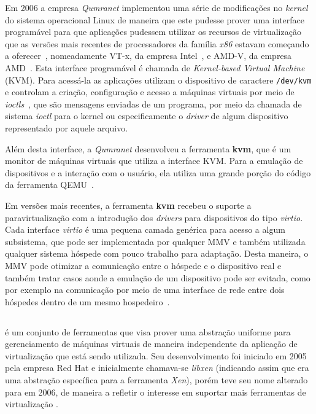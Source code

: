 Em 2006 a empresa \emph{Qumranet} implementou uma série de modificações no
\emph{kernel} do sistema operacional Linux de maneira que este pudesse prover
uma interface programável para que aplicações pudessem utilizar os recursos de
virtualização que as versões mais recentes de processadores da família
\emph{x86} estavam começando a oferecer~\cite{kerneltrap2007avi}, nomeadamente
VT-x, da empresa Intel~\cite{uhlig2005intel}, e AMD-V, da empresa
AMD~\cite{strongin2005trusted}.  Esta interface programável é chamada de
\emph{Kernel-based Virtual Machine} (KVM). Para acessá-la as aplicações
utilizam o dispositivo de caractere \texttt{/dev/kvm} e controlam a criação,
configuração e acesso a máquinas virtuais por meio de
\emph{ioctls}~\cite{kivity2007kvm}, que são mensagens enviadas de um programa,
por meio da chamada de sistema \emph{ioctl} para o kernel ou especificamente o
\emph{driver} de algum dispositivo representado por aquele arquivo.

Além desta interface, a \emph{Qumranet} desenvolveu a ferramenta \textbf{kvm},
que é um monitor de máquinas virtuais que utiliza a interface KVM. Para a
emulação de dispositivos e a interação com o usuário, ela utiliza uma grande
porção do código da ferramenta QEMU~\cite{kerneltrap2007avi}.

Em versões mais recentes, a ferramenta \textbf{kvm} recebeu o suporte a
paravirtualização com a introdução dos \emph{drivers} para dispositivos do tipo
\emph{virtio}. Cada interface \emph{virtio} é uma pequena camada genérica para
acesso a algum subsistema, que pode ser implementada por qualquer MMV e também
utilizada qualquer sistema hóspede com pouco trabalho para adaptação. Desta
maneira, o MMV pode otimizar a comunicação entre o hóspede e o dispositivo real
e também tratar casos aonde a emulação de um dispositivo pode ser evitada, como
por exemplo na comunicação por meio de uma interface de rede entre dois
hóspedes dentro de um mesmo hospedeiro~\cite{russell2008virtio}.


\subsection{\libvirt}\label{sec:libvirt}


\libvirt{} é um conjunto de ferramentas que visa prover uma abstração
uniforme para gerenciamento de máquinas virtuais de maneira independente 
da aplicação de virtualização que está sendo utilizada. Seu desenvolvimento
foi iniciado em 2005 pela empresa Red Hat e inicialmente chamava-se
\emph{libxen} (indicando assim que era uma abstração específica para a
ferramenta \emph{Xen}), porém teve seu nome alterado para \libvirt{} em
2006, de maneira a refletir o interesse em suportar mais ferramentas de
virtualização .

